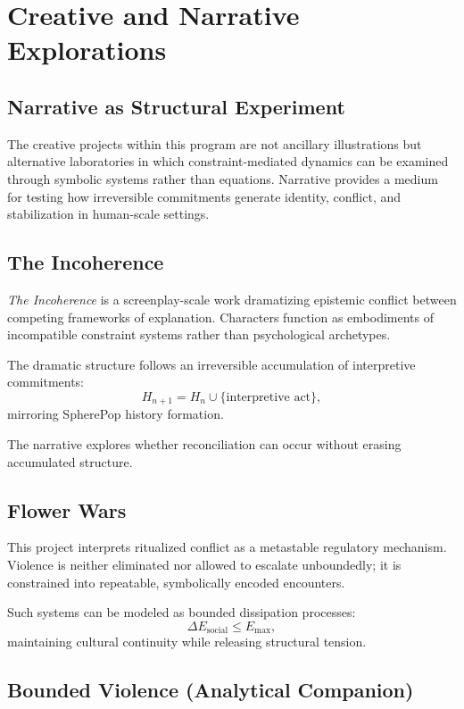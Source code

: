 \documentclass[12pt]{article}
\begin{document}
\section{Creative and Narrative Explorations}

\subsection{Narrative as Structural Experiment}

The creative projects within this program are not ancillary illustrations but alternative laboratories in which constraint-mediated dynamics can be examined through symbolic systems rather than equations. Narrative provides a medium for testing how irreversible commitments generate identity, conflict, and stabilization in human-scale settings.

\subsection{The Incoherence}

\emph{The Incoherence} is a screenplay-scale work dramatizing epistemic conflict between competing frameworks of explanation. Characters function as embodiments of incompatible constraint systems rather than psychological archetypes.

The dramatic structure follows an irreversible accumulation of interpretive commitments:
\[
H_{n+1}=H_n\cup\{\text{interpretive act}\},
\]
mirroring SpherePop history formation.

The narrative explores whether reconciliation can occur without erasing accumulated structure.

\subsection{Flower Wars}

This project interprets ritualized conflict as a metastable regulatory mechanism. Violence is neither eliminated nor allowed to escalate unboundedly; it is constrained into repeatable, symbolically encoded encounters.

Such systems can be modeled as bounded dissipation processes:
\[
\Delta E_{\text{social}}\le E_{\max},
\]
maintaining cultural continuity while releasing structural tension.

\subsection{Bounded Violence (Analytical Companion)}
\end{document}
